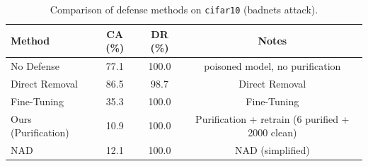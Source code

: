 \begin{table}[htbp]
\centering
\caption{Comparison of defense methods on \texttt{cifar10} (badnets attack).}
\label{tab:results}
\begin{tabular}{lccc}
\toprule
Method & CA (\%) & DR (\%) & Notes \\
\midrule
  No Defense & 77.1 & 100.0 & poisoned model, no purification \\
  Direct Removal & 86.5 & 98.7 & Direct Removal \\
  Fine-Tuning & 35.3 & 100.0 & Fine-Tuning \\
  Ours (Purification) & 10.9 & 100.0 & Purification + retrain (6 purified + 2000 clean) \\
  NAD & 12.1 & 100.0 & NAD (simplified) \\
\bottomrule
\end{tabular}
\end{table}